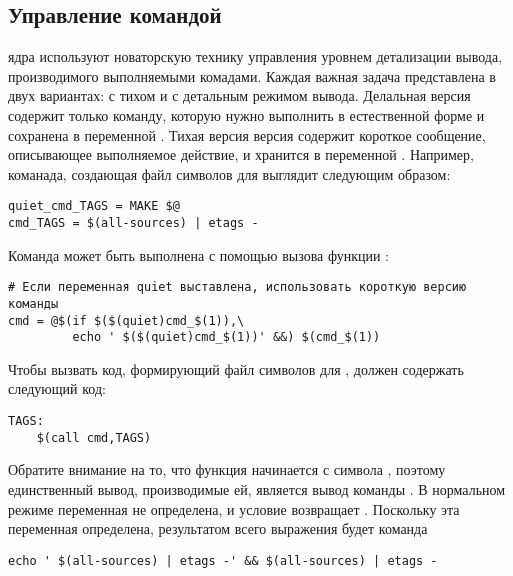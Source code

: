 \subsection{Управление командой }
\label{sec:managing_command_echo}
 ядра используют новаторскую технику управления уровнем
детализации вывода, производимого выполняемыми комадами. Каждая важная
задача представлена в двух вариантах: с тихом и с детальным режимом
вывода. Делальная версия содержит только команду, которую нужно
выполнить в естественной форме и сохранена в переменной
. Тихая версия версия содержит короткое
сообщение, описывающее выполняемое действие, и хранится в переменной
. Например, команада, создающая
файл символов для  выглядит следующим образом:

\begin{verbatim}
quiet_cmd_TAGS = MAKE $@
cmd_TAGS = $(all-sources) | etags -
\end{verbatim}

Команда может быть выполнена с помощью вызова функции :

\begin{verbatim}
# Если переменная quiet выставлена, использовать короткую версию команды
cmd = @$(if $($(quiet)cmd_$(1)),\
         echo ' $($(quiet)cmd_$(1))' &&) $(cmd_$(1))
\end{verbatim}

Чтобы вызвать код, формирующий файл символов для ,
\Makefile{} должен содержать следующий код:

\begin{verbatim}
TAGS:
    $(call cmd,TAGS) 
\end{verbatim}

Обратите внимание на то, что функция  начинается с символа
\Monospace{@}, поэтому единственный вывод, производимые ей, является
вывод команды \command{echo}. В нормальном режиме переменная
 не определена, и условие
 возвращает .
Поскольку эта переменная определена, результатом всего выражения будет
команда

\begin{verbatim}
echo ' $(all-sources) | etags -' && $(all-sources) | etags -
\end{verbatim}

